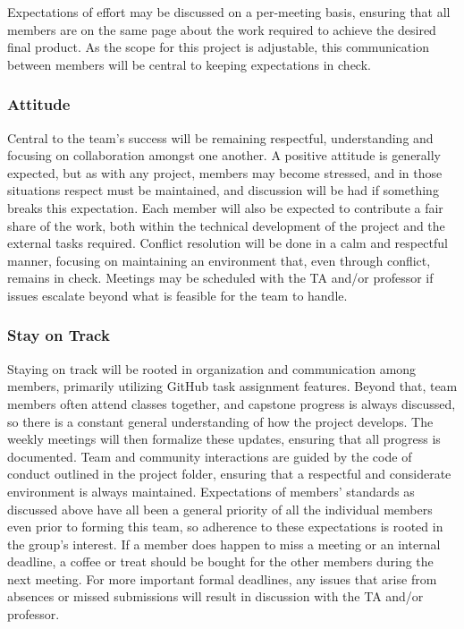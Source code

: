 \documentclass{article}
\begin{document}
Expectations of effort may be discussed on a per-meeting basis, ensuring that all members are on the same page 
about the work required to achieve the desired final product. As the scope for this project is adjustable, this 
communication between members will be central to keeping expectations in check.

\subsubsection*{Attitude}

Central to the team's success will be remaining respectful, understanding and focusing on collaboration amongst 
one another. A positive attitude is generally expected, but as with any project, members may become stressed, and in those 
situations respect must be maintained, and discussion will be had if something breaks this expectation. 
Each member will also be expected to contribute a fair share of the work, both within the technical development of the project 
and the external tasks required. Conflict resolution will be done in a calm and respectful manner, focusing on maintaining an environment 
that, even through conflict, remains in check. Meetings may be scheduled with the TA and/or professor if issues escalate beyond what is 
feasible for the team to handle.

\subsubsection*{Stay on Track}

Staying on track will be rooted in organization and communication among members, primarily utilizing GitHub task assignment features. Beyond 
that, team members often attend classes together, and capstone progress is always discussed, so there is a constant general understanding of how 
the project develops. The weekly meetings will then formalize these updates, ensuring that all progress is documented. Team and community interactions 
are guided by the code of conduct outlined in the project folder, ensuring that a respectful and considerate environment is always maintained. 
Expectations of members' standards as discussed above have all been a general priority of all the individual members even prior to forming this team, so adherence to these 
expectations is rooted in the group's interest. If a member does happen to miss a meeting or an internal deadline, a coffee or treat should be bought for 
the other members during the next meeting. For more important formal deadlines, any issues that arise from absences or missed submissions will result in 
discussion with the TA and/or professor. 
\end{document}
